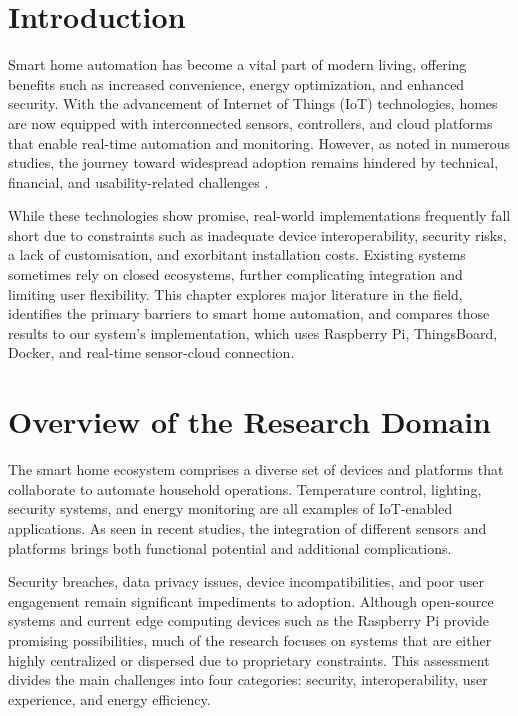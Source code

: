 \documentclass[a4paper,12pt]{report}
\begin{document}
\section{Introduction}
Smart home automation has become a vital part of modern living, offering benefits such as increased convenience, energy optimization, and enhanced security. With the advancement of Internet of Things (IoT) technologies, homes are now equipped with interconnected sensors, controllers, and cloud platforms that enable real-time automation and monitoring. However, as noted in numerous studies, the journey toward widespread adoption remains hindered by technical, financial, and usability-related challenges \cite{julies}\cite{Zhang2022TheCS}\cite{Ahmed02102021}.

While these technologies show promise, real-world implementations frequently fall short due to constraints such as inadequate device interoperability, security risks, a lack of customisation, and exorbitant installation costs.  Existing systems sometimes rely on closed ecosystems, further complicating integration and limiting user flexibility.  This chapter explores major literature in the field, identifies the primary barriers to smart home automation, and compares those results to our system's implementation, which uses Raspberry Pi, ThingsBoard, Docker, and real-time sensor-cloud connection.



\section{Overview of the Research Domain}
The smart home ecosystem comprises a diverse set of devices and platforms that collaborate to automate household operations.  Temperature control, lighting, security systems, and energy monitoring are all examples of IoT-enabled applications.  As seen in recent studies, the integration of different sensors and platforms brings both functional potential and additional complications\cite{Venkatesh}.

Security breaches, data privacy issues, device incompatibilities, and poor user engagement remain significant impediments to adoption.  Although open-source systems and current edge computing devices such as the Raspberry Pi provide promising possibilities, much of the research focuses on systems that are either highly centralized or dispersed due to proprietary constraints.  This assessment divides the main challenges into four categories: security, interoperability, user experience, and energy efficiency.
\end{document}

